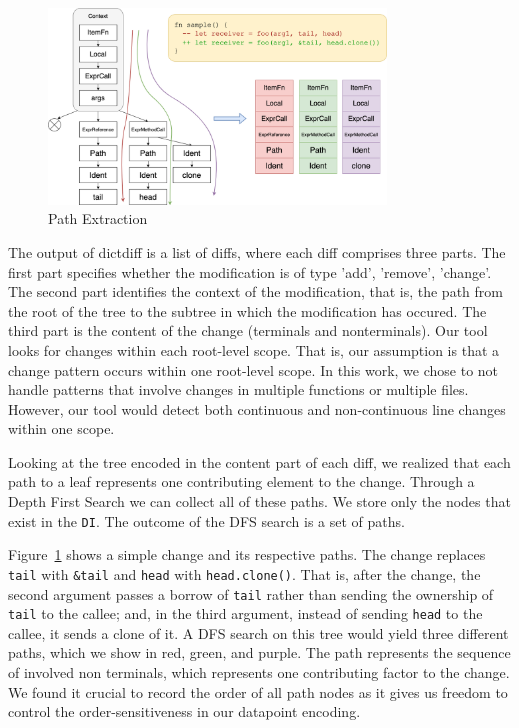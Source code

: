 \begin{figure}[h]
\centering
\includegraphics[width=0.8\textwidth]{figs/extraction.png}
\caption{\label{fig:extraction}Path Extraction}
\end{figure}

The output of dictdiff is a list of diffs, where each diff comprises three parts. The first part specifies whether the modification is of type 'add', 'remove', 'change'. The second part identifies the context of the modification, that is, the path from the root of the tree to the subtree in which the modification has occured. The third part is the content of the change (terminals and nonterminals). Our tool looks for changes within each root-level scope. That is, our assumption is that a change pattern occurs within one root-level scope. In this work, we chose to not handle patterns that involve changes in multiple functions or multiple files. However, our tool would detect both continuous and non-continuous line changes within one scope.

Looking at the tree encoded in the content part of each diff, we realized that each path to a leaf represents one contributing element to the change. Through a Depth First Search we can collect all of these paths. We store only the nodes that exist in the \verb+DI+. The outcome of the DFS search is a set of paths.

Figure~\ref{fig:extraction} shows a simple change and its respective paths. The change replaces \verb+tail+ with \verb+&tail+ and \verb+head+ with \verb+head.clone()+. That is, after the change, the second argument passes a borrow of \verb+tail+ rather than sending the ownership of \verb+tail+ to the callee; and, in the third argument, instead of sending \verb+head+ to the callee, it sends a clone of it. A DFS search on this tree would yield three different paths, which we show in red, green, and purple. The path represents the sequence of involved non terminals, which represents one contributing factor to the change. We found it crucial to record the order of all path nodes as it gives us freedom to control the order-sensitiveness in our datapoint encoding.

